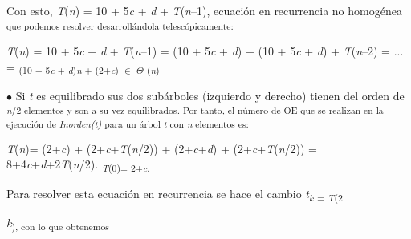 \documentclass[12pt]{article}
\renewcommand{\_}{\kern-1.5pt\textunderscore\kern-1.5pt}
\begin{document}
\begin{adjustwidth}{0.77in}{0.57in}
{\fontsize{10pt}{12.0pt}\selectfont Con esto, \textit{T}(\textit{n}) = 10 + 5\textit{c }+ \textit{d }+ \textit{T}(\textit{n}–1), ecuación en recurrencia no homogénea \textsubscript{que podemos resolver desarrollándola telescópicamente: }\par}\par

\end{adjustwidth}

\begin{adjustwidth}{0.87in}{0.78in}
{\fontsize{10pt}{12.0pt}\selectfont \textit{T}(\textit{n}) = 10 + 5\textit{c }+ \textit{d }+ \textit{T}(\textit{n}–1) = (10 + 5\textit{c }+ \textit{d}) + (10 + 5\textit{c }+ \textit{d}) + \textit{T}(\textit{n}–2) = ... = \textsubscript{(10 + 5\textit{c }+ \textit{d})\textit{n }+ (2+\textit{c}) $ \in $ $ \Theta $ (\textit{n}) }\par}\par

\end{adjustwidth}

\begin{adjustwidth}{0.57in}{0.57in}
{\fontsize{10pt}{12.0pt}\selectfont $\bullet$  Si \textit{t }es equilibrado sus dos subárboles (izquierdo y derecho) tienen del orden de \textit{\textsubscript{n}}\textsubscript{/2 elementos y son a su vez equilibrados\textit{. }Por tanto, el número de OE que se realizan en la ejecución de \textit{Inorden(t) }para un árbol \textit{t }con \textit{n }elementos es: }\par}\par

\end{adjustwidth}

\begin{adjustwidth}{0.97in}{0.78in}
{\fontsize{10pt}{12.0pt}\selectfont \textit{T}(\textit{n})= (2+\textit{c}) + (2+\textit{c}+\textit{T}(\textit{n}/2)) + (2+\textit{c}+\textit{d}) + (2+\textit{c}+\textit{T}(\textit{n}/2)) = 8+4\textit{c}+\textit{d}+2\textit{T}(\textit{n}/2). \textit{\textsubscript{T}}\textsubscript{(0)= 2+\textit{c}. }\par}\par

\end{adjustwidth}

\begin{adjustwidth}{0.77in}{0.57in}
{\fontsize{10pt}{12.0pt}\selectfont Para resolver esta ecuación en recurrencia se hace el cambio \textit{t\textsubscript{k }}\textsubscript{= \textit{T}(2}{\fontsize{7pt}{8.4pt}\selectfont \textit{k}\textsubscript{), con lo que obtenemos }\par}\par}\par

\end{adjustwidth}
\end{document}
